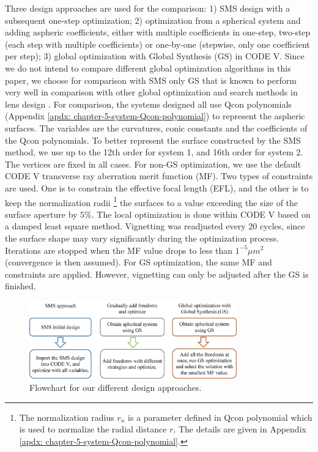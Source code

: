 Three design approaches are used for the comparison: 1) SMS design with a subsequent one-step optimization; 2) optimization from a spherical system and adding aspheric coefficients, either with multiple coefficients in one-step, two-step (each step with multiple coefficients) or one-by-one (stepwise, only one coefficient per step); 3) global optimization with Global Synthesis (GS) in CODE V. Since we do not intend to compare different global optimization algorithms in this paper, we choose for comparison with SMS only GS that is known to perform very well in comparison with other global optimization and search methods in lens design \cite{KuperGO1992}\cite{ShaferComPhy1994}. For comparison, the systems designed all use Qcon polynomials (Appendix \ref{apdx: chapter-5-system-Qcon-polynomial}) to represent the aspheric surfaces. The variables are the curvatures, conic constants and the coefficients of the Qcon polynomials. To better represent the surface constructed by the SMS method, we use up to the 12th order for system 1, and 16th order for system 2. The vertices are fixed in all cases. For non-GS optimization, we use the default CODE V transverse ray aberration merit function (MF). Two types of constraints are used. One is to constrain the effective focal length (EFL), and the other is to keep the normalization radii \footnote{The normalization radius $r_n$ is a parameter defined in Qcon polynomial which is used to normalize the radial distance $r$. The details are given in Appendix \ref{apdx: chapter-5-system-Qcon-polynomial}.} the surfaces to a value exceeding the size of the surface aperture by $5\%$. The local optimization is done within CODE V based on a damped least square method. Vignetting was readjusted every 20 cycles, since the surface shape may vary significantly during the optimization process. Iterations are stopped when the MF value drops to less than $1^{-5} \mu m^2$ (convergence is then assumed). For GS optimization, the same MF and constraints are applied. However, vignetting can only be adjusted after the GS is finished. 

\begin{figure}[h!]
    \centering
    \includegraphics[width=0.8\textwidth]{chapter-5/figures/Fig3_flowchart.png}
    \caption{Flowchart for our different design approaches.}
    \label{fig: fig3_flowchart}
\end{figure}

